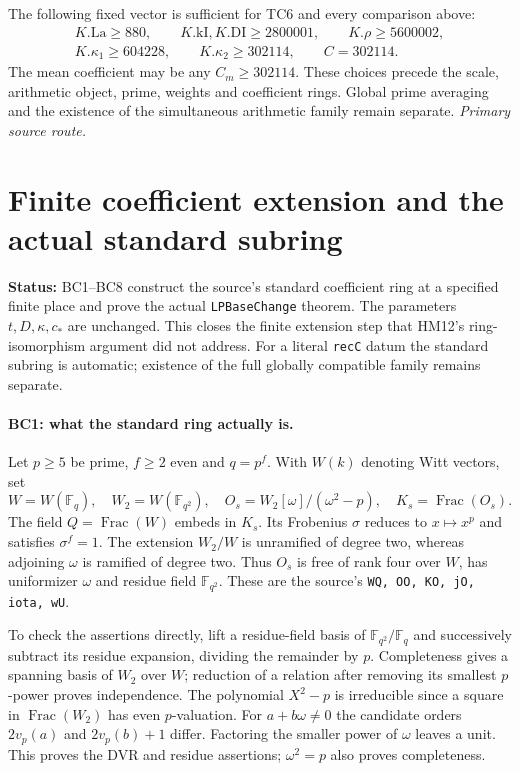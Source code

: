\documentclass[11pt,a4paper]{article}
\numberwithin{equation}{section}
\theoremstyle{remark}\newtheorem{remark}[theorem]{Remark}
\newcommand{\status}[1]{\textbf{Status:} #1}
\begin{document}
The following fixed vector is sufficient for TC6 and every
comparison above:
\[
\begin{gathered}
 K.\mathrm{La}\ge880,\qquad
 K.\mathrm{kI},K.\mathrm{DI}\ge2800001,\qquad
 K.\rho\ge5600002,\\
 K.\kappa_1\ge604228,\qquad K.\kappa_2\ge302114,
 \qquad C=302114.
\end{gathered}                                                    \tag{GI.15}
\]
The mean coefficient may be any $C_m\ge302114$.
These choices precede the scale, arithmetic object, prime,
weights and coefficient rings. Global prime averaging and the
existence of the simultaneous arithmetic family remain separate.
\noindent\textit{Primary source route.}\cite{type-one-family}


\section{Finite coefficient extension and the actual standard subring}
\label{sec:finite-base-change}

\status{BC1--BC8 construct the source's standard coefficient ring at a
specified finite place and prove the actual \texttt{LPBaseChange} theorem.
The parameters $t,D,\kappa,c_*$ are unchanged. This closes the finite
extension step that HM12's ring-isomorphism argument did not address.
For a literal \texttt{recC} datum the standard subring is automatic;
existence of the full globally compatible family remains separate.}

\paragraph{BC1: what the standard ring actually is.}
Let $p\ge5$ be prime, $f\ge2$ even and $q=p^f$. With $W(k)$ denoting
Witt vectors, set
\[
 W=W(\mathbb F_q),\quad W_2=W(\mathbb F_{q^2}),\quad
 O_s=W_2[\omega]/(\omega^2-p),\quad K_s=\operatorname{Frac}(O_s).
                                                               \tag{BC.1}
\]
The field $Q=\operatorname{Frac}(W)$ embeds in $K_s$. Its Frobenius
$\sigma$ reduces to $x\mapsto x^p$ and satisfies $\sigma^f=1$.
The extension $W_2/W$ is unramified of degree two, whereas adjoining
$\omega$ is ramified of degree two. Thus $O_s$ is free of rank four
over $W$, has uniformizer $\omega$ and residue field $\mathbb F_{q^2}$.
These are the source's \texttt{WQ, OO, KO, jO, iota, wU}.

To check the assertions directly, lift a residue-field basis of
$\mathbb F_{q^2}/\mathbb F_q$ and successively subtract its residue
expansion, dividing the remainder by $p$. Completeness gives a spanning
basis of $W_2$ over $W$; reduction of a relation after removing its
smallest $p$-power proves independence. The polynomial $X^2-p$ is
irreducible since a square in $\operatorname{Frac}(W_2)$ has even
$p$-valuation. For $a+b\omega\ne0$ the candidate orders
$2v_p(a)$ and $2v_p(b)+1$ differ. Factoring the smaller power of
$\omega$ leaves a unit. This proves the DVR and residue assertions;
$\omega^2=p$ also proves completeness.
\end{document}
